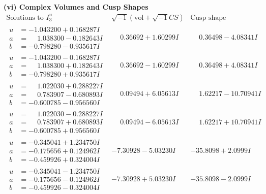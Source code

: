\documentclass[1p]{elsarticle_modified}
\theoremstyle{definition}
\newcommand{\I}{\sqrt{-1}}
\begin{document}
\newpage\flushleft \textbf{(vi) Complex Volumes and Cusp Shapes}
$$\begin{array}{c|c|c}  
\text{Solutions to }I^u_{3}& \I (\text{vol} + \sqrt{-1}CS) & \text{Cusp shape}\\
 \hline 
\begin{aligned}
u &= -1.043200 + 0.168287 I \\
a &= \phantom{-}1.038300 - 0.182643 I \\
b &= -0.798280 - 0.935617 I\end{aligned}
 & \phantom{-}0.36692 + 1.60299 I & \phantom{-}0.36498 - 4.08341 I \\ \hline\begin{aligned}
u &= -1.043200 - 0.168287 I \\
a &= \phantom{-}1.038300 + 0.182643 I \\
b &= -0.798280 + 0.935617 I\end{aligned}
 & \phantom{-}0.36692 - 1.60299 I & \phantom{-}0.36498 + 4.08341 I \\ \hline\begin{aligned}
u &= \phantom{-}1.022030 + 0.288227 I \\
a &= \phantom{-}0.783907 - 0.680893 I \\
b &= -0.600785 - 0.956560 I\end{aligned}
 & \phantom{-}0.09494 + 6.05613 I & \phantom{-}1.62217 - 10.70941 I \\ \hline\begin{aligned}
u &= \phantom{-}1.022030 - 0.288227 I \\
a &= \phantom{-}0.783907 + 0.680893 I \\
b &= -0.600785 + 0.956560 I\end{aligned}
 & \phantom{-}0.09494 - 6.05613 I & \phantom{-}1.62217 + 10.70941 I \\ \hline\begin{aligned}
u &= -0.345041 + 1.234750 I \\
a &= -0.175656 + 0.124962 I \\
b &= -0.459926 + 0.324004 I\end{aligned}
 & -7.30928 - 5.03230 I & -35.8098 + 2.0999 I \\ \hline\begin{aligned}
u &= -0.345041 - 1.234750 I \\
a &= -0.175656 - 0.124962 I \\
b &= -0.459926 - 0.324004 I\end{aligned}
 & -7.30928 + 5.03230 I & -35.8098 - 2.0999 I \\ \hline\begin{aligned}

\end{aligned}
\end{array}$$
\end{document}
